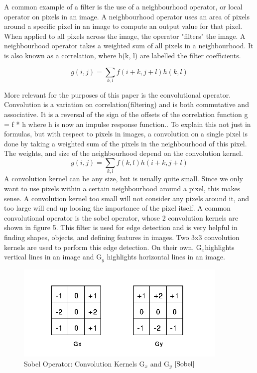 \documentclass[12pt]{report} %
\begin{document}
	A common example of a filter is the use of a neighbourhood operator, or local operator on pixels in an image. A neighbourhood operator uses an area of pixels around a specific pixel in an image to compute an output value for that pixel. When applied to all pixels across the image, the operator "filters" the image. A neighbourhood operator takes a weighted sum of all pixels in a neighbourhood. It is also known as a correlation, where h(k, l) are labelled the filter coefficients.\cite{szeliski2010computer} 
	
\begin{equation}
g(i,j) = \sum_{k,l} f(i+k,j+l)h(k,l)
\end{equation}
	
	More relevant for the purposes of this paper is the convolutional operator. Convolution is a variation on correlation(filtering) and is both commutative and associative. It is a reversal of the sign of the offsets of the correlation function  g = f * h where h is now an impulse response function.\cite{szeliski2010computer}. To explain this not just in formulas, but with respect to pixels in images, a convolution on a single pixel is done by taking a weighted sum of the pixels in the neighbourhood of this pixel. The weights, and size of the neighbourhood depend on the convolution kernel\cite{RiverTrail}. 
\begin{equation}
g(i,j) = \sum_{k,l} f(k, l)h(i + k, j + l)
\end{equation}
	A convolution kernel can be any size, but is usually quite small. Since we only want to use pixels within a certain neighbourhood around a pixel, this makes sense. A convolution kernel too small will not consider any pixels around it, and too large will end up loosing the importance of the pixel itself. A common convolutional operator is the sobel operator, whose 2 convolution kernels are shown in figure 5. This filter is used for edge detection and is very helpful in finding shapes, objects, and defining features in images. Two 3x3 convolution kernels are used to perform this edge detection\cite{Sobel}. On their own, G$_{x}$highlights vertical lines in an image and G$_{y}$ highlights horizontal lines in an image.
\begin{figure}
\centering
\includegraphics[width=4in]{sobel_operator} 
\caption{Sobel Operator: Convolution Kernels G$_{x}$ and G$_{y}$ $\cite{Sobel}$}
\end{figure}	
\end{document}
